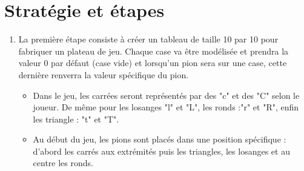 \documentclass[20pt]{report}
\begin{document}
   \begin{flushleft}
   \begin{enumerate}
    \Huge 
   \end{enumerate}
   
   
   \large
   \parskip=25pt
   \section*{Stratégie et étapes}
   \begin{enumerate} %
   
	\item La première étape consiste à créer un tableau de taille 10 par 10 pour fabriquer un plateau de jeu. Chaque case va être modélisée et prendra la valeur 0 par défaut (case vide) et lorsqu'un pion sera sur une case, cette dernière renverra la valeur spécifique du pion. \newline
	
	  \begin{itemize}
	  
		\item Dans le jeu, les carrées seront représentés par des "c" et des "C" selon le joueur. De même pour les losanges "l" et "L", les ronds :"r" et "R", enfin les triangle : "t" et "T".\newline 
	  
		\item  Au début du jeu, les pions sont placés dans une position spécifique : d'abord les carrés aux extrémités puis les triangles, les losanges et au centre les ronds. 
	

\end{itemize}
\end{enumerate}
\end{flushleft}
\end{document}
